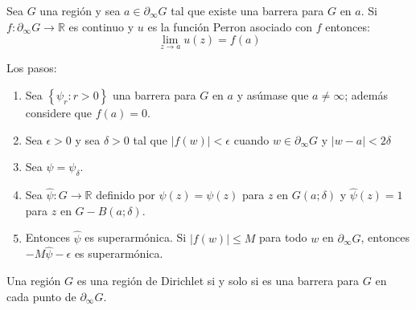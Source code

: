 \begin{teorema}
    Sea $G$ una región y sea $a \in \partial_{\infty} G$ tal que existe una barrera para $G$ en $a$. Si $f: \partial_{\infty} G \rightarrow \mathbb{R}$ es continuo y $u$ es la función Perron asociado con $f$ entonces:
$$
\lim _{z \rightarrow a} u(z)=f(a)
$$

\begin{dem}
    Los pasos: 
    \begin{enumerate}
        \item Sea $\left\{\psi_r: r>0\right\}$ una barrera para $G$ en $a$ y asúmase que $a \neq \infty$; además considere que $f(a)=0$.
        \item Sea $\epsilon>0$ y sea $\delta>0$ tal que $|f(w)|<\epsilon$ cuando $w \in \partial_{\infty} G$ y $|w-a|<2 \delta$
        \item Sea $\psi=\psi_\delta$. 
        \item Sea $\hat{\psi}: G \rightarrow \mathbb{R}$  definido por $\hat{\psi}(z)=\psi(z)$ para $z$ en $G(a ; \delta)$ y $\hat{\psi}(z)=1$ para $z$ en $G-B(a ; \delta)$.
        \item Entonces $\hat{\psi}$ es superarmónica. Si $|f(w)| \leq M$ para todo $w$ en $\partial_{\infty} G$, entonces $-M \hat{\psi}-\epsilon$ es superarmónica.
    \end{enumerate}
    
\end{dem}

\end{teorema}

\begin{corolario}
    Una región $G$ es una región de Dirichlet si y solo si es una barrera para $G$  en cada punto de $\partial_{\infty} G$.
\end{corolario}

\cite{conway2012functions}
\cite{gamelin2003complex}
\cite{tanton2005encyclopedia}






